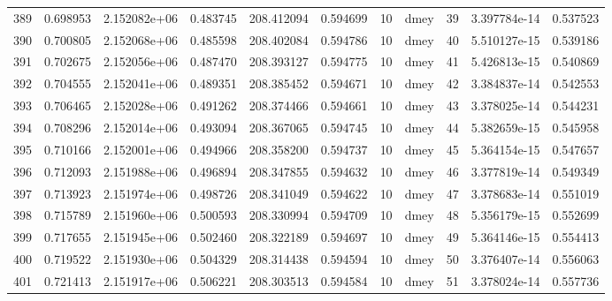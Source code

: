 \begin{tabular}{lrrrrrrlrrr}
389  &    0.698953 &        2.152082e+06 &  0.483745 &              208.412094 &    0.594699 &      10 &         dmey &     39 &   3.397784e-14 &      0.537523 \\
390  &    0.700805 &        2.152068e+06 &  0.485598 &              208.402084 &    0.594786 &      10 &         dmey &     40 &   5.510127e-15 &      0.539186 \\
391  &    0.702675 &        2.152056e+06 &  0.487470 &              208.393127 &    0.594775 &      10 &         dmey &     41 &   5.426813e-15 &      0.540869 \\
392  &    0.704555 &        2.152041e+06 &  0.489351 &              208.385452 &    0.594671 &      10 &         dmey &     42 &   3.384837e-14 &      0.542553 \\
393  &    0.706465 &        2.152028e+06 &  0.491262 &              208.374466 &    0.594661 &      10 &         dmey &     43 &   3.378025e-14 &      0.544231 \\
394  &    0.708296 &        2.152014e+06 &  0.493094 &              208.367065 &    0.594745 &      10 &         dmey &     44 &   5.382659e-15 &      0.545958 \\
395  &    0.710166 &        2.152001e+06 &  0.494966 &              208.358200 &    0.594737 &      10 &         dmey &     45 &   5.364154e-15 &      0.547657 \\
396  &    0.712093 &        2.151988e+06 &  0.496894 &              208.347855 &    0.594632 &      10 &         dmey &     46 &   3.377819e-14 &      0.549349 \\
397  &    0.713923 &        2.151974e+06 &  0.498726 &              208.341049 &    0.594622 &      10 &         dmey &     47 &   3.378683e-14 &      0.551019 \\
398  &    0.715789 &        2.151960e+06 &  0.500593 &              208.330994 &    0.594709 &      10 &         dmey &     48 &   5.356179e-15 &      0.552699 \\
399  &    0.717655 &        2.151945e+06 &  0.502460 &              208.322189 &    0.594697 &      10 &         dmey &     49 &   5.364146e-15 &      0.554413 \\
400  &    0.719522 &        2.151930e+06 &  0.504329 &              208.314438 &    0.594594 &      10 &         dmey &     50 &   3.376407e-14 &      0.556063 \\
401  &    0.721413 &        2.151917e+06 &  0.506221 &              208.303513 &    0.594584 &      10 &         dmey &     51 &   3.378024e-14 &      0.557736 \\

\end{tabular}

